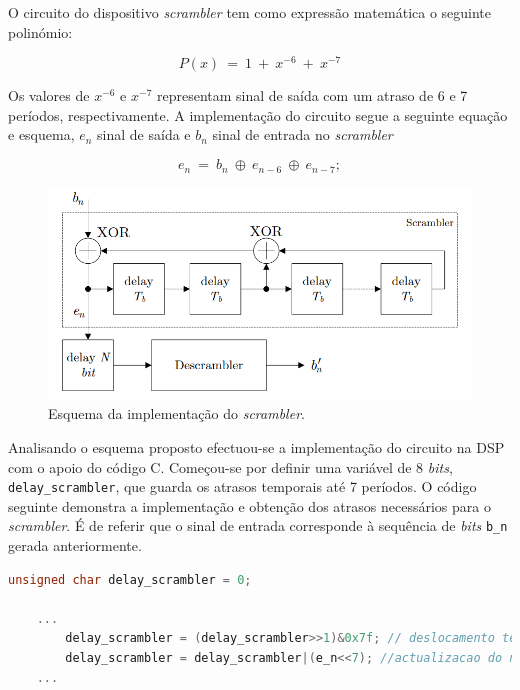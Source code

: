 \documentclass[11pt]{article}
\numberwithin{equation}{section}
\begin{document}
O circuito do dispositivo \textit{scrambler} tem como expressão matemática o seguinte polinómio:

\vspace{-3mm}
\begin{equation}
	P(x)~= ~1~+~x^{-6}~+~x^{-7}
\end{equation}  

\vspace{1mm}
Os valores de $x^{-6}$ e $x^{-7}$ representam sinal de saída com um atraso de 6 e 7 períodos, respectivamente. A implementação do circuito segue a seguinte equação e esquema, $e_n$ sinal de saída e $b_n$ sinal de entrada no  \textit{scrambler}

\vspace{-3mm}
\begin{equation}
	e_n~= ~b_n~\oplus~e_{n-6}~\oplus~e_{n-7};
\end{equation}  

\begin{figure}[H]
	\centering
	\includegraphics[keepaspectratio=true, scale=0.50]{teoricas/scrambler}
	\caption{Esquema da implementação do \textit{scrambler}.}
	\vspace{-0.8em}
\end{figure}

Analisando o esquema proposto efectuou-se a implementação do circuito na DSP com o apoio do código C.
Começou-se por definir uma variável de 8 \textit{bits}, \texttt{delay\_scrambler}, que guarda os atrasos temporais até 7 períodos. O código seguinte demonstra a implementação e obtenção dos atrasos necessários para o \textit{scrambler}. É de referir que o sinal de entrada corresponde à sequência de \textit{bits} \texttt{b\_n} gerada anteriormente.

\begin{lstlisting}[language=C]
	unsigned char delay_scrambler = 0;
	
	...
		delay_scrambler = (delay_scrambler>>1)&0x7f; // deslocamento temporal
		delay_scrambler = delay_scrambler|(e_n<<7); //actualizacao do novo valor de e_n no vector	
	...
\end{lstlisting}
\end{document}

